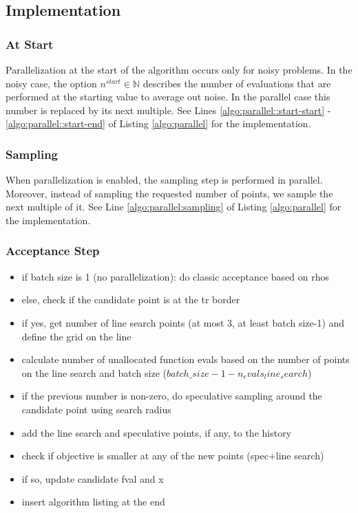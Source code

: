 \subsection{Implementation}\label{subsec:parallelization::implementation}

\subsubsection{At Start}

Parallelization at the start of the algorithm occurs only for noisy problems. In the noisy case, the
option $n^{start} \in \mathbb{N}$ describes the number of evaluations that are performed at the
starting value to average out noise. In the parallel case this number is replaced by its next
multiple. See Lines \ref{algo:parallel::start-start} - \ref{algo:parallel::start-end} of Listing
\ref{algo:parallel} for the implementation.

\subsubsection{Sampling}

When parallelization is enabled, the sampling step is performed in parallel. Moreover, instead of
sampling the requested number of points, we sample the next multiple of it. See Line
\ref{algo:parallel:sampling} of Listing \ref{algo:parallel} for the
implementation.

\subsubsection{Acceptance Step}

\begin{itemize}
    \item if batch size is 1 (no parallelization): do classic acceptance based on rhos
    \item else, check if the candidate point is at the tr border
    \item if yes, get number of line search points (at most 3, at least batch size-1) and define the
        grid on the line
    \item calculate number of unallocated function evals based on the number of points on the line
        search and batch size ($batch\_size-1-n_evals_line_search$) 
    \item if the previous number is non-zero, do speculative sampling around the candidate point
        using search radius
    \item add the line search and speculative points, if any, to the history
    \item check if objective is smaller at any of the new points (spec+line search)
    \item if so, update candidate fval and x
    \item insert algorithm listing at the end
\end{itemize}

